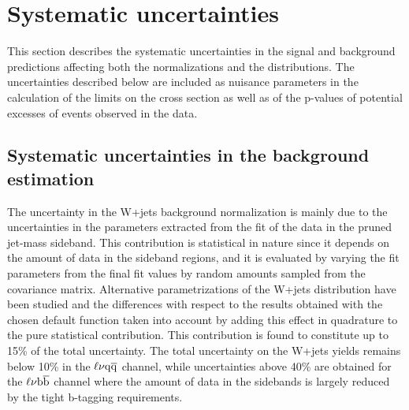 \section{Systematic uncertainties}\label{sec:systUnc}

This section describes the systematic uncertainties in the signal and background predictions affecting both the normalizations and the \mlvj distributions.
The uncertainties described below are included as nuisance parameters in the calculation of the limits on the cross section as well as of the p-values of potential excesses of events
observed in the data. %

\subsection{Systematic uncertainties in the background estimation}\label{subsec:uncBkg}

The uncertainty in the W+jets background normalization is mainly due to the uncertainties in the parameters extracted from the fit of the data in the pruned jet-mass sideband. This contribution is statistical in nature since it depends on the amount of data in the \mJ sideband regions, and it is evaluated by varying the fit parameters from the final fit values by random amounts sampled from the covariance matrix.
Alternative parametrizations of the W+jets \mJ distribution have been studied and the differences with respect to the results obtained with the chosen default function taken into account by adding this effect in quadrature to the pure statistical contribution.
This contribution is found to constitute up to 15\% of the total uncertainty. The total uncertainty on the W+jets yields remains below 10\% in the $\ell\nu\mathrm{q}\overline{\mathrm{q}}$ channel, while uncertainties above 40\% are obtained for the $\ell\nu{\mathrm{b}\overline{\mathrm{b}}}$ channel where the amount of data in the sidebands is largely reduced by the tight b-tagging requirements.

